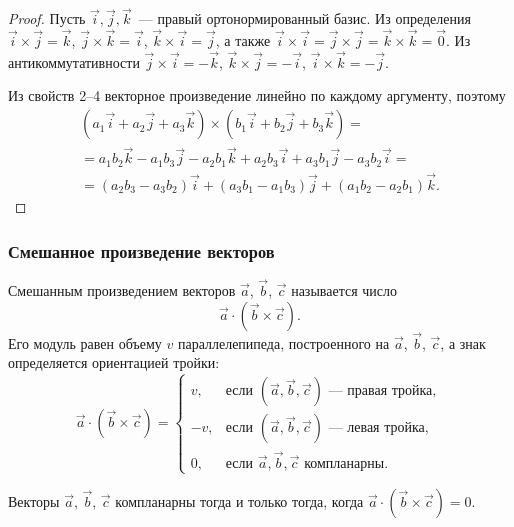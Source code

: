 \documentclass[12pt]{article}
\begin{document}
    \begin{proof}
    	Пусть $\vec{i}, \vec{j}, \vec{k}$~--- правый ортонормированный базис. Из определения $\vec{i} \times \vec{j} = \vec{k}$, $\vec{j} \times \vec{k} = \vec{i}$, $\vec{k} \times \vec{i} = \vec{j}$, а также $\vec{i} \times \vec{i} = \vec{j} \times \vec{j} = \vec{k} \times \vec{k} = \vec{0}$. Из антикоммутативности $\vec{j} \times \vec{i} = -\vec{k}$, $\vec{k} \times \vec{j} = -\vec{i}$, $\vec{i} \times \vec{k} = -\vec{j}$.
    
    	Из свойств 2--4 векторное произведение линейно по каждому аргументу, поэтому
    	\begin{multline*}
    		(a_1\vec{i} + a_2\vec{j} + a_3\vec{k}) \times (b_1\vec{i} + b_2\vec{j} + b_3\vec{k}) = \\
    		= a_1b_2 \vec{k} - a_1b_3 \vec{j} - a_2b_1 \vec{k} + a_2b_3 \vec{i} + a_3b_1 \vec{j} - a_3b_2 \vec{i} = \\
    		= (a_2b_3 - a_3b_2)\vec{i} + (a_3b_1 - a_1b_3)\vec{j} + (a_1b_2 - a_2b_1)\vec{k}.
    	\end{multline*}
    \end{proof}
    
    \subsubsection{Смешанное произведение векторов}
    
    \begin{definition}
    	Смешанным произведением векторов $\vec{a}$, $\vec{b}$, $\vec{c}$ называется число
    	\[
    		\vec{a} \cdot \left( \vec{b} \times \vec{c} \right).
    	\]
    	Его модуль равен объему $v$ параллелепипеда, построенного на $\vec{a}$, $\vec{b}$, $\vec{c}$, а знак определяется ориентацией тройки:
    	\[
    		\vec{a} \cdot \left( \vec{b} \times \vec{c} \right) =
    		\begin{cases}
    			v, & \text{если } (\vec{a}, \vec{b}, \vec{c}) \text{~--- правая тройка}, \\
    			-v, & \text{если } (\vec{a}, \vec{b}, \vec{c}) \text{~--- левая тройка}, \\
    			0, & \text{если } \vec{a}, \vec{b}, \vec{c} \text{ компланарны}.
    		\end{cases}
    	\]
    \end{definition}
    
    \begin{statement}
    	Векторы $\vec{a}$, $\vec{b}$, $\vec{c}$ компланарны тогда и только тогда, когда $\vec{a} \cdot \left( \vec{b} \times \vec{c} \right) = 0$.
    \end{statement}
    
\end{document}
